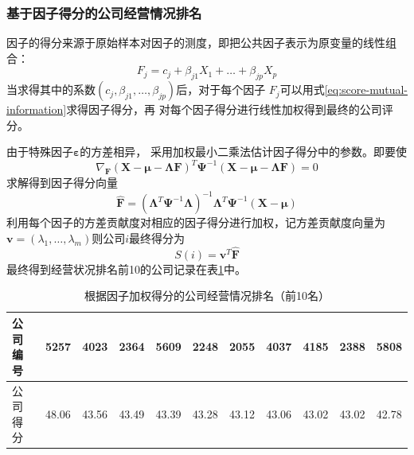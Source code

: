 \subsubsection{基于因子得分的公司经营情况排名}
因子的得分来源于原始样本对因子的测度，即把公共因子表示为原变量的线性组合：
\begin{equation}
F_{j}=c_j + \beta_{j1}X_1+\ldots+ \beta_{jp}X_p
\label{eq:score-for-one-factor}
\end{equation}
当求得其中的系数$(c_j,\beta_{j1},\ldots,\beta_{jp})$后，对于每个因子
$F_j$可以用式\ref{eq:score-mutual-information}求得因子得分，再
对每个因子得分进行线性加权得到最终的公司评分。
\par 由于特殊因子$\bm{\varepsilon}$的方差相异，
采用加权最小二乘法估计因子得分中的参数。即要使
\begin{equation*}
\nabla_{\bm{F}} (\bm{X-\mu-\Lambda F})^T \bm{\Psi}^{-1} (\bm{X-\mu-\Lambda F}) = 0
\end{equation*}
求解得到因子得分向量
\begin{equation*}
\hat{\bm{F}}=(\bm{\Lambda}^T\bm{\Psi}^{-1}\bm{\Lambda})^{-1}
\bm{\Lambda}^T \bm{\Psi}^{-1} (\bm{X}-\bm{\mu})
\end{equation*}
利用每个因子的方差贡献度对相应的因子得分进行加权，记方差贡献度向量为
$\bm{v}=(\lambda_1,\ldots,\lambda_m)$则公司$i$最终得分为
\begin{equation*}
S(i) = \bm{v}^T \hat{\bm{F}}
\end{equation*}
最终得到经营状况排名前10的公司记录在表\ref{tab:order-company}中。
\begin{table}[ht]
\centering
    \begin{tabular}{@{}lllllllllll@{}}
    \toprule[1.5pt]
    公司编号 & 5257  & 4023  & 2364  & 5609  & 2248  & 2055  & 4037  & 4185  & 2388  & 5808  \\ \midrule[0.5pt]
    公司得分 & 48.06 & 43.56 & 43.49 & 43.39 & 43.28 & 43.12 & 43.06 & 43.02 & 43.02 & 42.78 \\ \bottomrule[1.5pt]
    \end{tabular}
\caption{根据因子加权得分的公司经营情况排名（前10名）}
\label{tab:order-company}
\end{table}
